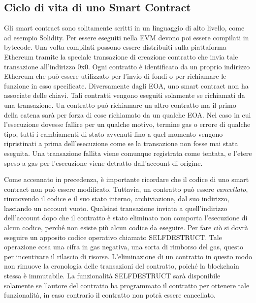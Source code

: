 \subsection{Ciclo di vita di uno Smart Contract}
Gli smart contract sono solitamente scritti in un linguaggio di alto livello, come ad esempio Solidity. Per essere eseguiti nella EVM devono poi essere compilati in bytecode. Una volta compilati possono essere distribuiti sulla piattaforma Ethereum tramite la speciale transazione di creazione contratto che invia tale transazione all'indirizzo 0x0. Ogni contratto è identificato da un proprio indirizzo Ethereum che può essere utilizzato per l'invio di fondi o per richiamare le funzione in esso specificate. Diversamente dagli EOA, uno smart contract non ha associate delle chiavi. Tali contratti vengono eseguiti solamente se richiamati da una transazione. Un contratto può richiamare un altro contratto ma il primo della catena sarà per forza di cose richiamato da un qualche EOA. Nel caso in cui l'esecuzione dovesse fallire per un qualche motivo, termine gas o errore di qualche tipo, tutti i cambiamenti di stato avvenuti fino a quel momento vengono ripristinati a prima dell'esecuzione come se la transazione non fosse mai stata eseguita. Una transazione fallita viene comunque registrata come tentata, e l'etere speso a gas per l'esecuzione viene detratto dall'account di origine. 

Come accennato in precedenza, è importante ricordare che il codice di uno smart contract non può essere modificato. Tuttavia, un contratto può essere \textit{cancellato}, rimuovendo il codice e il suo stato interno, archiviazione, dal suo indirizzo, lasciando un account vuoto. Qualsiasi transazione inviata a quell'indirizzo dell'account dopo che il contratto è stato eliminato non comporta l'esecuzione di alcun codice, perché non esiste più alcun codice da eseguire. Per fare ciò si dovrà eseguire un apposito codice operativo chiamato SELFDESTRUCT. Tale operazione cosa una cifra in gas negativa, una sorta di rimborso del gas, questo per incentivare il rilascio di risorse. L'eliminazione di un contratto in questo modo non rimuove la cronologia delle transazioni del contratto, poiché la blockchain stessa è immutabile. La funzionalità SELFDESTRUCT sarà disponibile solamente se l'autore del contratto ha programmato il contratto per ottenere tale funzionalità, in caso contrario il contratto non potrà essere cancellato.

